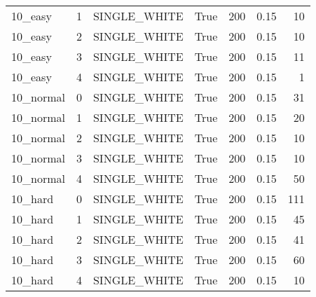 \begin{tabular}{lrllrrr}
 10\_easy       &              1 & SINGLE\_WHITE    & True            &          200 &   0.15 &              10 \\
 10\_easy       &              2 & SINGLE\_WHITE    & True            &          200 &   0.15 &              10 \\
 10\_easy       &              3 & SINGLE\_WHITE    & True            &          200 &   0.15 &              11 \\
 10\_easy       &              4 & SINGLE\_WHITE    & True            &          200 &   0.15 &               1 \\
 10\_normal     &              0 & SINGLE\_WHITE    & True            &          200 &   0.15 &              31 \\
 10\_normal     &              1 & SINGLE\_WHITE    & True            &          200 &   0.15 &              20 \\
 10\_normal     &              2 & SINGLE\_WHITE    & True            &          200 &   0.15 &              10 \\
 10\_normal     &              3 & SINGLE\_WHITE    & True            &          200 &   0.15 &              10 \\
 10\_normal     &              4 & SINGLE\_WHITE    & True            &          200 &   0.15 &              50 \\
 10\_hard       &              0 & SINGLE\_WHITE    & True            &          200 &   0.15 &             111 \\
 10\_hard       &              1 & SINGLE\_WHITE    & True            &          200 &   0.15 &              45 \\
 10\_hard       &              2 & SINGLE\_WHITE    & True            &          200 &   0.15 &              41 \\
 10\_hard       &              3 & SINGLE\_WHITE    & True            &          200 &   0.15 &              60 \\
 10\_hard       &              4 & SINGLE\_WHITE    & True            &          200 &   0.15 &              10 \\
\hline
\end{tabular}